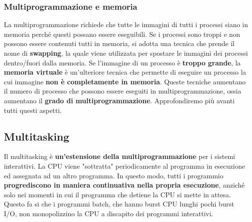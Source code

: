 \documentclass[12pt]{article}
\begin{document}
\subsubsection{Multiprogrammazione e memoria}
La multiprogrammazione richiede che tutte le immagini di tutti i processi siano in memoria perché questi possano essere eseguibili.
Se i processi sono troppi e non possono essere contenuti tutti in memoria, si adotta una tecnica che prende il nome di \textbf{swapping}, la quale viene utilizzata
per spostare le immagini dei processi dentro/fuori dalla memoria.
Se l'immagine di un processo è \textbf{troppo grande}, la \textbf{memoria virtuale} è un'ulteriore tecnica che permette di eseguire un processo la cui immagine \textbf{non è completamente in memoria}.
Queste tecniche aumentano il numero di processo che possono essere eseguiti in multiprogrammazione, ossia aumentano il \textbf{grado di multiprogrammazione}.
Approfondiremo più avanti tutti questi aspetti.
\subsection{Multitasking}
Il multitasking è \textbf{un'estensione della multiprogrammazione} per i sistemi interattivi.
La CPU viene "sottratta" periodicamente al programma in esecuzione ed assegnata ad un altro programma.
In questo modo, tutti i programmio \textbf{progrediscono in maniera continuativa nella propria esecuzione}, anziché solo
nei momenti in cui il programma che detiene la CPU si mette in attesa.
Questo fa si che i programmi batch, che hanno burst CPU lunghi pochi burst I/O, non monopolizzino la CPU a discapito dei programmi interattivi.
\end{document}
